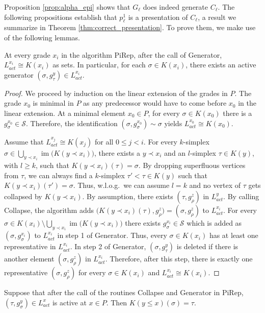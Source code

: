 \documentclass[english,a4paper,nolineno,cleveref]{socg-lipics-v2021}
\DeclareMathOperator{\im}{im}
\begin{document}
Proposition \ref{prop:alpha_epi} shows that $G_\ell$ does indeed generate $C_\ell$. The following propositions establish that $p_\ell^1$ is a presentation of $C_\ell$, a result we summarize in Theorem \ref{thm:correct_presentation}. To prove them, we make use of the following lemmas. 

\begin{lemma} \label{lem:act_gen_simp}
At every grade $x_i$ in the algorithm {\sc PiRep}, after the call of {\sc Generator}, $L^{x_i}_{act}\cong K(x_i)$ as sets. In particular, for each $\sigma\in K(x_i)$, there exists an active generator $(\sigma,g_\tau^y)\in L_{act}^{x_i}$.
\end{lemma}

\begin{proof}
We proceed by induction on the linear extension of the grades in $P$. The grade $x_0$ is minimal in $P$ as any predecessor would have to come before $x_0$ in the linear extension. At a minimal element $x_0\in P$, for every $\sigma\in K(x_0)$ there is a $g_\sigma^{x_0}\in\mathcal{S}$. Therefore, the identification $(\sigma,g^{x_0}_\sigma)\sim \sigma$ yields $L_{act}^{x_0}\cong K(x_0)$.

Assume that $L_{act}^{x_j}\cong K(x_j)$ for all $0\leq j < i$. For every $k$-simplex $\sigma\in \bigcup_{y\prec x_i}\im \!\big(K(y\prec x_i)\big)$, there exists a $y\prec x_i$ and an $l$-simplex $\tau\in K(y)$, with $l\geq k$, such that $K(y\prec x_i)(\tau)=\sigma$. By dropping superfluous vertices from $\tau$, we can always find a $k$-simplex $\tau'<\tau\in K(y)$ such that $K(y\prec x_i)(\tau')=\sigma$. Thus, w.l.o.g.\ we can assume $l=k$ and no vertex of $\tau$ gets collapsed by $K(y\prec x_i)$.  By assumption, there exists $(\tau,g^z_\rho)$ in $L^y_{act}$. By calling {\sc Collapse}, the algorithm adds $(K(y\prec x_i)(\tau),g^z_\rho\big)=(\sigma,g^z_\rho)$ to $L^{x_i}_{act}$. For every $\sigma\in K(x_i)\setminus \bigcup_{y\prec x_i}\im \!\big(K(y\prec x_i)\big)$ there exists $g^{x_i}_\sigma\in\mathcal{S}$ which is added as $(\sigma,g^{x_i}_{\sigma})$ to $L_{act}^{x_i}$ in step 1 of {\sc Generator}. Thus, every $\sigma\in K(x_i)$ has at least one representative in $L_{act}^{x_i}$. In step 2 of {\sc Generator}, $(\sigma,g^y_\tau)$ is deleted if there is another element $(\sigma,g^z_\rho)$ in $L_{act}^{x_i}$. Therefore, after this step, there is exactly one representative $(\sigma,g^z_\rho)$ for every $\sigma\in K(x_i)$ and $L_{act}^{x_i}\cong K(x_i)$.
\end{proof}

\begin{lemma} \label{lemma:algo_1}
Suppose that after the call of the routines {\sc Collapse} and {\sc Generator} in {\sc PiRep}, $(\tau,g^y_\sigma)\in L_{act}^x$ is active at $x\in P$. Then $K(y\leq x)(\sigma)=\tau$. 
\end{lemma}
\end{document}

